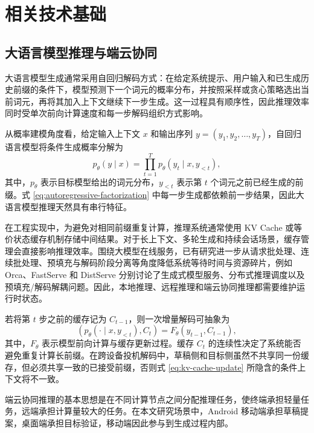 \section{相关技术基础}

\subsection{大语言模型推理与端云协同}

大语言模型生成通常采用自回归解码方式：在给定系统提示、用户输入和已生成历史前缀的条件下，模型预测下一个词元的概率分布，并按照采样或贪心策略选出当前词元，再将其加入上下文继续下一步生成\cite{vaswani2017attention,touvron2023llama2}。这一过程具有顺序性，因此推理效率同时受单次前向计算速度和每一步解码组织方式影响。

从概率建模角度看，给定输入上下文 $x$ 和输出序列 $y=(y_1,y_2,\ldots,y_T)$，自回归语言模型将条件生成概率分解为
\begin{equation}
  p_{\theta}(y \mid x)
  = \prod_{t=1}^{T} p_{\theta}(y_t \mid x, y_{<t}),
  \label{eq:autoregressive-factorization}
\end{equation}
其中，$p_{\theta}$ 表示目标模型给出的词元分布，$y_{<t}$ 表示第 $t$ 个词元之前已经生成的前缀。式 \eqref{eq:autoregressive-factorization} 中每一步生成都依赖前一步结果，因此大语言模型推理天然具有串行特征。

在工程实现中，为避免对相同前缀重复计算，推理系统通常使用 KV Cache 或等价状态缓存机制存储中间结果。对于长上下文、多轮生成和持续会话场景，缓存管理会直接影响推理效率\cite{kwon2023pagedattention,dao2022flashattention}。围绕大模型在线服务，已有研究进一步从请求批处理、连续批处理、预填充与解码阶段分离等角度降低系统等待时间与资源碎片，例如 Orca、FastServe 和 DistServe 分别讨论了生成式模型服务、分布式推理调度以及预填充/解码解耦问题\cite{yu2022orca,wu2023fastserve,zhong2024distserve}。因此，本地推理、远程推理和端云协同推理都需要维护运行时状态。

若将第 $t$ 步之前的缓存记为 $C_{t-1}$，则一次增量解码可抽象为
\begin{equation}
  (p_{\theta}(\cdot \mid x,y_{<t}), C_t)
  = F_{\theta}(y_{t-1}, C_{t-1}),
  \label{eq:kv-cache-update}
\end{equation}
其中，$F_{\theta}$ 表示模型前向计算与缓存更新过程。缓存 $C_t$ 的连续性决定了系统能否避免重复计算长前缀。在跨设备投机解码中，草稿侧和目标侧虽然不共享同一份缓存，但必须共享一致的已接受前缀，否则式 \eqref{eq:kv-cache-update} 所隐含的条件上下文将不一致。

端云协同推理的基本思想是在不同计算节点之间分配推理任务，使终端承担轻量任务，远端承担计算量较大的任务\cite{satyanarayanan2017edge,shi2016edge}。在本文研究场景中，Android 移动端承担草稿提案，桌面端承担目标验证，移动端因此参与到生成过程内部。

